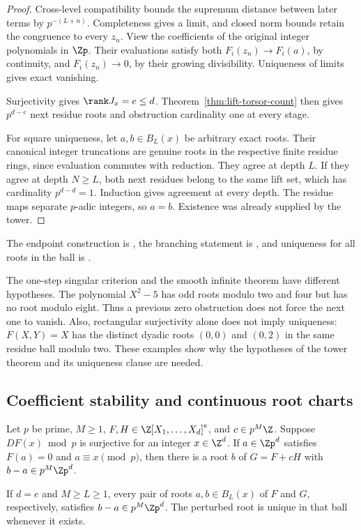 \begin{proof}
Cross-level compatibility bounds the supremum distance between later terms
by $p^{-(L+n)}$. Completeness gives a limit, and closed norm bounds retain
the congruence to every $z_n$. View the coefficients of the original integer
polynomials in $\Zp$. Their evaluations satisfy
both $F_i(z_n)\to F_i(a)$, by continuity, and $F_i(z_n)\to0$, by their
growing divisibility. Uniqueness of limits gives exact vanishing.

Surjectivity gives $\rank J_x=e\le d$. Theorem~\ref{thm:lift-torsor-count}
then gives $p^{d-e}$ next residue roots and obstruction cardinality one at
every stage.

For square uniqueness, let $a,b\in B_L(x)$ be arbitrary exact roots.
Their canonical integer truncations are genuine roots in the respective
finite residue rings, since evaluation commutes with reduction. They agree
at depth $L$. If they agree at depth $N\ge L$, both next residues belong
to the same lift set, which has cardinality $p^{d-d}=1$. Induction gives
agreement at every depth. The residue maps separate $p$-adic integers, so
$a=b$. Existence was already supplied by the tower.
\end{proof}

The endpoint construction is
, the
branching statement is
, and uniqueness
for all roots in the ball is
.

\begin{remark}\label{rem:singular-tower-boundary}
The one-step singular criterion and the smooth infinite theorem have
different hypotheses. The polynomial $X^2-5$ has odd roots modulo two and
four but has no root modulo eight. Thus a previous zero obstruction does
not force the next one to vanish. Also, rectangular surjectivity alone
does not imply uniqueness: $F(X,Y)=X$ has the distinct dyadic roots
$(0,0)$ and $(0,2)$ in the same residue ball modulo two. These examples show
why the hypotheses of the tower theorem and its uniqueness clause are needed.
\end{remark}

\subsection{Coefficient stability and continuous root charts}

\begin{proposition}\label{prop:smooth-coefficient-stability}
Let $p$ be prime, $M\ge1$, $F,H\in\Z[X_1,\ldots,X_d]^e$, and
$c\in p^M\Z$. Suppose $DF(x)\bmod p$ is surjective for an integer
$x\in\Z^d$. If $a\in\Zp^d$ satisfies $F(a)=0$ and
$a\equiv x\pmod p$, then there is a root $b$ of $G=F+cH$ with
$b-a\in p^M\Zp^d$.

If $d=e$ and $M\ge L\ge1$, every pair of roots $a,b\in B_L(x)$ of
$F$ and $G$, respectively, satisfies $b-a\in p^M\Zp^d$. The perturbed
root is unique in that ball whenever it exists.
\end{proposition}

